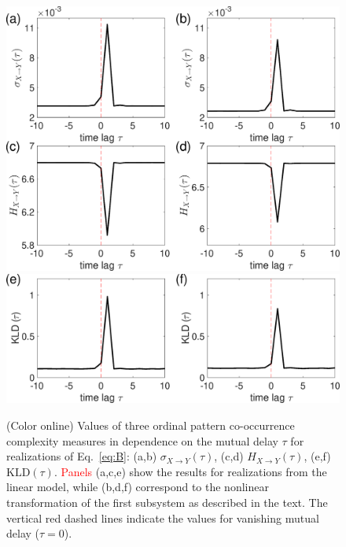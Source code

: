 \documentclass[12pt,aip,cha,reprint,nofootinbib]{revtex4-1}
\begin{document}
\begin{figure}
	\centering
	\includegraphics[width=\columnwidth]{E_B.eps}
	\includegraphics[width=\columnwidth]{KL_B.eps}
\caption{(Color online) Values of three ordinal pattern co-occurrence complexity measures in dependence on the mutual delay $\tau$ for realizations of Eq.~\eqref{eq:B}: (a,b) $\sigma_{X\to Y}(\tau)$, (c,d) $H_{X \to Y}(\tau)$, (e,f) $\text{KLD}(\tau)$. \textcolor{red}{Panels} (a,c,e) show the results for realizations from the linear model, while (b,d,f) correspond to the nonlinear transformation of the first subsystem as described in the text. The vertical red dashed lines indicate the values for vanishing mutual delay ($\tau=0$).
\label{fig:stdHeqB}}
\end{figure}
\end{document}
